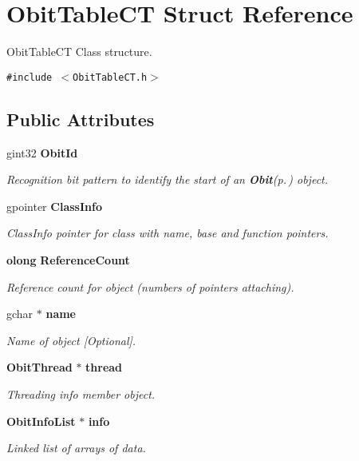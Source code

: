 \section{Obit\-Table\-CT Struct Reference}
\label{structObitTableCT}
Obit\-Table\-CT Class structure.  


{\tt \#include $<$Obit\-Table\-CT.h$>$}

\subsection*{Public Attributes}
\begin{CompactItemize}
\item 
gint32 {\bf Obit\-Id}
\begin{CompactList}\small\item\em Recognition bit pattern to identify the start of an {\bf Obit}{\rm (p.\,\pageref{structObit})} object. \item\end{CompactList}\item 
gpointer {\bf Class\-Info}
\begin{CompactList}\small\item\em Class\-Info pointer for class with name, base and function pointers. \item\end{CompactList}\item 
{\bf olong} {\bf Reference\-Count}
\begin{CompactList}\small\item\em Reference count for object (numbers of pointers attaching). \item\end{CompactList}\item 
gchar $\ast$ {\bf name}
\begin{CompactList}\small\item\em Name of object [Optional]. \item\end{CompactList}\item 
{\bf Obit\-Thread} $\ast$ {\bf thread}
\begin{CompactList}\small\item\em Threading info member object. \item\end{CompactList}\item 
{\bf Obit\-Info\-List} $\ast$ {\bf info}
\begin{CompactList}\small\item\em Linked list of arrays of data. \item\end{CompactList}\item 

\end{CompactItemize}
